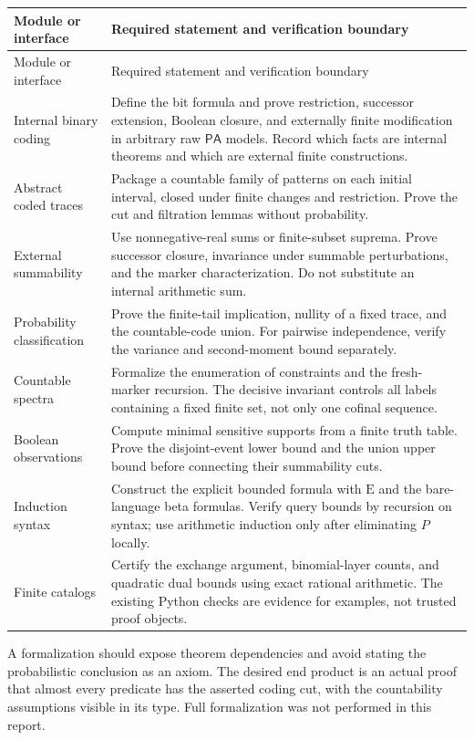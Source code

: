 \documentclass[11pt]{article}
\numberwithin{equation}{section}
\theoremstyle{definition}
\theoremstyle{remark}
\newcommand{\PA}{\mathsf{PA}}
\newcommand{\E}{\mathrm E}
\begin{document}
\begin{longtable}{p{}p{}}
\toprule
Module or interface & Required statement and verification boundary\\
\midrule
\endfirsthead
\toprule
Module or interface & Required statement and verification boundary\\
\midrule
\endhead
Internal binary coding & Define the bit formula and prove restriction,
successor extension, Boolean closure, and externally finite modification
in arbitrary raw $\PA$ models. Record which facts are internal theorems
and which are external finite constructions.\\
Abstract coded traces & Package a countable family of patterns on each
initial interval, closed under finite changes and restriction. Prove the
cut and filtration lemmas without probability.\\
External summability & Use nonnegative-real sums or finite-subset suprema.
Prove successor closure, invariance under summable perturbations, and the
marker characterization. Do not substitute an internal arithmetic sum.\\
Probability classification & Prove the finite-tail implication, nullity
of a fixed trace, and the countable-code union. For pairwise independence,
verify the variance and second-moment bound separately.\\
Countable spectra & Formalize the enumeration of constraints and the
fresh-marker recursion. The decisive invariant controls all labels
containing a fixed finite set, not only one cofinal sequence.\\
Boolean observations & Compute minimal sensitive supports from a finite
truth table. Prove the disjoint-event lower bound and the union upper
bound before connecting their summability cuts.\\
Induction syntax & Construct the explicit bounded formula with $\E$ and
the bare-language beta formulas. Verify query bounds by recursion on
syntax; use arithmetic induction only after eliminating $P$ locally.\\
Finite catalogs & Certify the exchange argument, binomial-layer counts,
and quadratic dual bounds using exact rational arithmetic. The existing
Python checks are evidence for examples, not trusted proof objects.\\
\bottomrule
\end{longtable}

A formalization should expose theorem dependencies and avoid stating the
probabilistic conclusion as an axiom. The desired end product is an actual
proof that almost every predicate has the asserted coding cut, with the
countability assumptions visible in its type. Full formalization was not
performed in this report.
\end{document}

